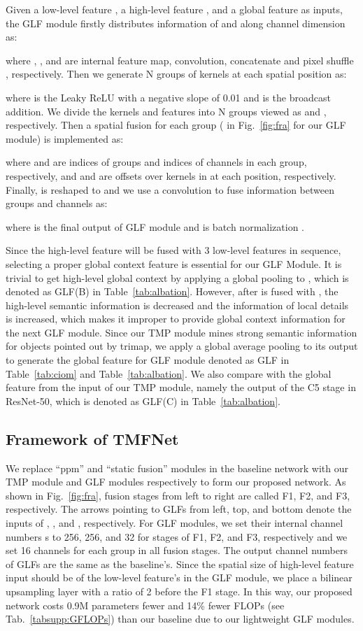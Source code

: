 \documentclass[10pt,twocolumn,letterpaper]{article}
\begin{document}
Given a low-level feature  , a high-level feature  , and  a global feature  as inputs, the GLF module firstly distributes information of  and  along channel dimension as:

where , ,  and  are internal feature map,  convolution, concatenate and pixel shuffle \cite{ps}, respectively. Then we generate N groups of  kernels  at each spatial position as:

where  is the Leaky ReLU \cite{leaky} with a negative slope of 0.01 and  is the broadcast addition. We divide the kernels and features into N groups viewed as  and , respectively. Then a spatial fusion for each group ( in Fig.~\ref{fig:fra} for our GLF module) is implemented as:

where  and  are indices of groups and indices of channels in each group, respectively, and  and   are offsets over  kernels in  at each position, respectively. Finally,  is reshaped to  and we use a  convolution to fuse information between groups and channels as:

where  is the final output of GLF module and  is batch normalization \cite{bn}.

Since the high-level feature will be fused with 3 low-level features in sequence, selecting a proper global context feature  is essential for our GLF Module. It is trivial to get high-level global context by applying a global pooling to , which is denoted as GLF(B) in Table~\ref{tab:albation}. However, after  is fused with , the high-level semantic information is decreased and the information of local details is increased, which makes it improper to provide global context information for the next GLF module. Since our TMP module mines strong semantic information for  objects pointed out by trimap, we apply a  global average pooling to its output to generate the global feature  for GLF module denoted as GLF in  Table~\ref{tab:ciom} and Table~\ref{tab:albation}. We also compare with the global feature from the input of our TMP module, namely the output of the C5 stage in ResNet-50, which is denoted as GLF(C) in Table~\ref{tab:albation}.

\subsection{Framework of TMFNet}
We replace ``ppm'' and ``static fusion'' modules in the baseline network with our TMP module and GLF modules respectively to form our proposed network. As shown in Fig.~\ref{fig:fra}, fusion stages from left to right are called F1, F2, and F3, respectively. The arrows pointing to GLFs from left, top, and bottom denote the inputs of , , and , respectively. For GLF modules, we set their internal channel numbers s 
to 256, 256, and 32 for stages of F1, F2, and F3, respectively and we set 16 channels for each group in all fusion stages. The output channel numbers of GLFs are the same as the baseline's. Since the spatial size of high-level feature input should be  of the low-level feature's in the GLF module, we place a bilinear upsampling layer with a ratio of 2 before the F1 stage. In this way, our proposed network costs 0.9M parameters fewer and 14\% fewer FLOPs (see Tab.~\ref{tabsupp:GFLOPs}) than our baseline due to our lightweight GLF modules.
\end{document}

